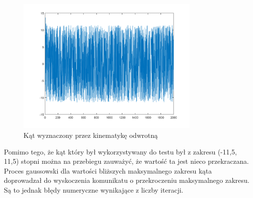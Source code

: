 \documentclass[a4paper, 12pt]{report}
\begin{document}
				\begin{figure}[H]
					\centering
					\includegraphics[width = 0.8\textwidth]{./AP/img/random_gauss_in_3.png}
					\caption{Kąt wyznaczony przez kinematykę odwrotną}
				\end{figure}
				\noindent Pomimo tego, że kąt który był wykorzystywany do testu był z zakresu (-11,5, 11,5) stopni można na przebiegu zauważyć, że wartość ta jest nieco przekraczana. Proces gaussowski dla wartości bliższych maksymalnego zakresu kąta doprowadzał do wyskoczenia komunikatu o przekroczeniu maksymalnego zakresu. Są to jednak błędy numeryczne wynikające z liczby iteracji.
			\newpage
\end{document}
